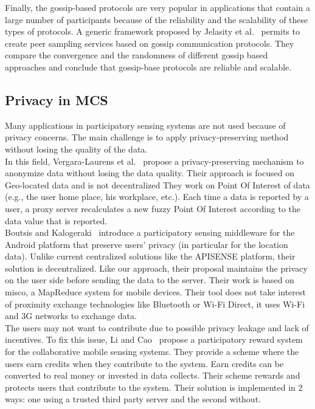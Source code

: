 Finally, the gossip-based protocols are very popular in applications that contain a large number of participants because of the reliability and the scalability of these types of protocols.
A generic framework proposed by Jelasity et al.~\cite{DBLP:conf/middleware/JelasityGKS04} permits to create peer sampling services based on gossip communication protocols.
They compare the convergence and the randomness of different gossip based approaches and conclude that gossip-base protocols are reliable and scalable.

\subsection{Privacy in MCS}

Many applications in participatory sensing systems are not used because of privacy concerns. 
The main challenge is to apply privacy-preserving method without losing the quality of the data.
\\

In this field, Vergara-Laurens et al.~\cite{DBLP:conf/percom/Vergara-LaurensML14} propose a privacy-preserving mechanism to anonymize data without losing the data quality.
Their approach is focused on Geo-located data and is not decentralized
They work on Point Of Interest of data (e.g., the user home place, his workplace, etc.).
Each time a data is reported by a user, a proxy server recalculates a new fuzzy Point Of Interest according to the data value that is reported.
\\

Boutsis and Kalogeraki~\cite{DBLP:conf/percom/BoutsisK13} introduce a participatory sensing middleware for the Android platform that preserve users' privacy (in particular for the location data).
Unlike current centralized solutions like the APISENSE platform, their solution is decentralized.
Like our approach, their proposal maintains the privacy on the user side before sending the data to the server.
Their work is based on misco, a MapReduce system for mobile devices.
Their tool does not take interest of proximity exchange technologies like Bluetooth or Wi-Fi Direct, it uses Wi-Fi and 3G networks to exchange data.
\\

The users may not want to contribute due to possible privacy leakage and lack of incentives.
To fix this issue, Li and Cao~\cite{DBLP:conf/percom/LiC13} propose a participatory reward system for the collaborative mobile sensing systems.
They provide a scheme where the users earn credits when they contribute to the system.
Earn credits can be converted to real money or invested in data collects.
Their scheme rewards and protects users that contribute to the system.
Their solution is implemented in 2 ways: one using a trusted third party server and the second without.
\\

